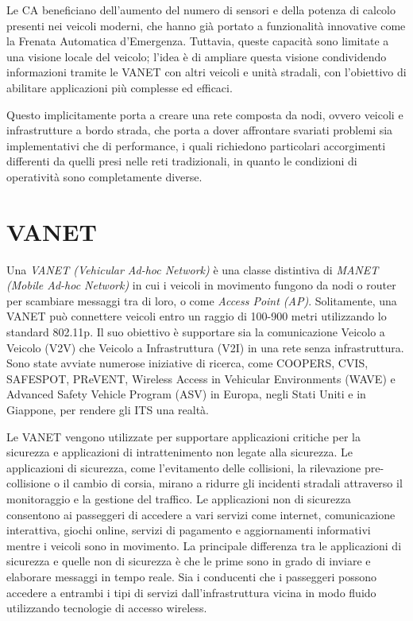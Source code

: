 Le CA beneficiano dell'aumento del numero di sensori e della potenza di calcolo presenti nei veicoli moderni, che hanno già portato a funzionalità innovative come la Frenata Automatica d'Emergenza. Tuttavia, queste capacità sono limitate a una visione locale del veicolo; l'idea è di ampliare questa visione condividendo informazioni tramite le VANET con altri veicoli e unità stradali, con l'obiettivo di abilitare applicazioni più complesse ed efficaci. 

Questo implicitamente porta a creare una rete composta da nodi, ovvero veicoli e infrastrutture a bordo strada, che porta a dover affrontare svariati problemi sia implementativi che di performance, i quali richiedono particolari accorgimenti differenti da quelli presi nelle reti tradizionali, in quanto le condizioni di operatività sono completamente diverse.

\section{VANET}
Una \textit{VANET (Vehicular Ad-hoc Network)} è una classe distintiva di \textit{MANET (Mobile Ad-hoc Network)} in cui i veicoli in movimento fungono da nodi o router per scambiare messaggi tra di loro, o come \textit{Access Point (AP)}. Solitamente, una VANET può connettere veicoli entro un raggio di 100-900 metri utilizzando lo standard 802.11p. Il suo obiettivo è supportare sia la comunicazione Veicolo a Veicolo (V2V) che Veicolo a Infrastruttura (V2I) in una rete senza infrastruttura. Sono state avviate numerose iniziative di ricerca, come COOPERS, CVIS, SAFESPOT, PReVENT, Wireless Access in Vehicular Environments (WAVE) e Advanced Safety Vehicle Program (ASV) in Europa, negli Stati Uniti e in Giappone, per rendere gli ITS una realtà. 

Le VANET vengono utilizzate per supportare applicazioni critiche per la sicurezza e applicazioni di intrattenimento non legate alla sicurezza. Le applicazioni di sicurezza, come l'evitamento delle collisioni, la rilevazione pre-collisione o il cambio di corsia, mirano a ridurre gli incidenti stradali attraverso il monitoraggio e la gestione del traffico. Le applicazioni non di sicurezza consentono ai passeggeri di accedere a vari servizi come internet, comunicazione interattiva, giochi online, servizi di pagamento e aggiornamenti informativi mentre i veicoli sono in movimento. La principale differenza tra le applicazioni di sicurezza e quelle non di sicurezza è che le prime sono in grado di inviare e elaborare messaggi in tempo reale. Sia i conducenti che i passeggeri possono accedere a entrambi i tipi di servizi dall'infrastruttura vicina in modo fluido utilizzando tecnologie di accesso wireless.

